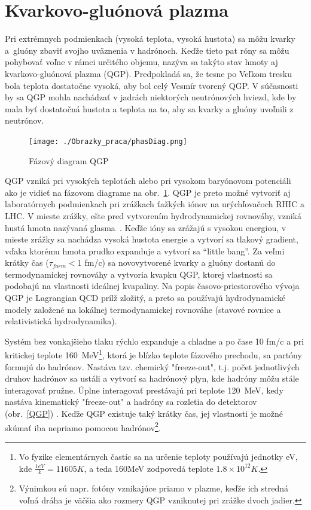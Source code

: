 \documentclass[thesismargins, thesislinespacing]{rnthesis}
\begin{document}
\section{Kvarkovo-gluónová plazma}

Pri extrémnych podmienkach (vysoká teplota, vysoká hustota) sa môžu kvarky a~gluó\-ny zbaviť svojho uväznenia v hadrónoch. Keďže tieto pat
róny sa môžu pohybovať voľne v rámci určitého objemu, nazýva sa takýto stav hmoty aj kvarkovo-gluónová plazma (QGP). Predpokladá sa, že tesne po Veľkom tresku bola teplota dostatočne vysoká, aby bol celý Vesmír tvorený QGP. V súčasnosti by sa QGP mohla nachádzať v jadrách niektorých neutrónových hviezd, kde by mala byť dostatočná hustota a teplota na to, aby sa kvarky a gluóny uvoľnili z neutrónov.

\begin{figure}[hbtp!]
	\begin{center}
		\texttt{[image: ./Obrazky\_praca/phasDiag.png]}
		\caption{ Fázový diagram QGP \cite{phasDiagram}}
		\label{fazDiag}
	\end{center}
\end{figure}  

QGP vzniká pri vysokých teplotách alebo pri vysokom baryónovom potenciáli ako je vidieť na fázovom diagrame na obr.~\ref{fazDiag}. QGP je preto možné vytvoriť aj laboratórnych podmienkach pri zrážkach ťažkých iónov na urýchľovačoch RHIC a LHC. V mieste zrážky, ešte pred vytvorením hydrodynamickej rovnováhy, vzniká hustá hmota nazývaná glasma~\cite{glasma}.  Keďže ióny sa zrážajú s vysokou energiou, v mieste zrážky sa nachádza vysoká hustota energie a vytvorí sa tlakový gradient, vďaka ktorému hmota prudko expanduje a vytvorí sa “little bang”. Za veľmi krátky čas ($\tau_{form}<1$ fm/c)  sa novovytvorené kvarky a gluóny dostanú do termodynamickej rovnováhy a vytvoria kvapku QGP, ktorej vlastnosti sa podobajú na vlastnosti ideálnej kvapaliny. Na popis časovo-priestorového vývoja QGP je Lagrangian QCD prílž zložitý, a preto sa používajú hydrodynamické modely založené na lokálnej termodynamickej rovnováhe (stavové rovnice a relativistická hydrodynamika).

Systém bez vonkajšieho tlaku rýchlo expanduje a chladne a po čase 10 fm/c a pri kritickej teplote 160~MeV\footnote{Vo fyzike elementárnych častíc sa na určenie teploty používajú jednotky eV, kde $\frac{1eV}{k}= 11605K$, a teda 160MeV zodpovedá teplote $1.8\times10^{12}K$.}, ktorá je blízko teplote fázového prechodu, sa partóny formujú do hadrónov. Nastáva tzv. chemický "freeze-out\-", t.j. počet jednotlivých druhov hadrónov sa ustáli a vytvorí sa hadrónový plyn, kde hadróny môžu stále interagovať pružne. Úplne interagovať prestávajú pri teplote 120~MeV, kedy nastáva kinematický "freeze-out" \-a hadróny sa rozletia do detektorov (obr.~\ref{QGP}) . Keďže QGP existuje taký krátky čas, jej vlastnosti je možné skúmať iba nepriamo pomocou hadrónov\footnote{Výnimkou sú napr. fotóny vznikajúce priamo v plazme, keďže ich stredná voľná dráha je väčšia ako rozmery QGP vzniknutej pri zrážke dvoch jadier.}.  
\end{document}

